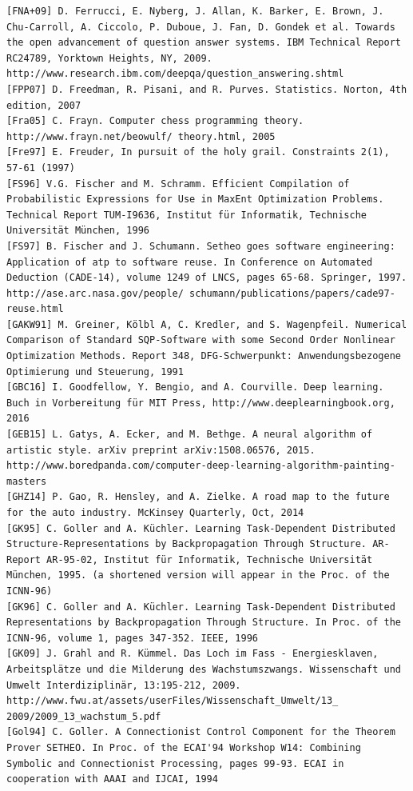 \documentclass[10pt]{book}
\begin{document}
\begin{center}
\begin{enumerate}
\begin{center}
\begin{center}
\begin{center}
\begin{center}
\begin{center}
\begin{verbatim}
[FNA+09] D. Ferrucci, E. Nyberg, J. Allan, K. Barker, E. Brown, J. Chu-Carroll, A. Ciccolo, P. Duboue, J. Fan, D. Gondek et al. Towards the open advancement of question answer systems. IBM Technical Report RC24789, Yorktown Heights, NY, 2009. http://www.research.ibm.com/deepqa/question_answering.shtml
[FPP07] D. Freedman, R. Pisani, and R. Purves. Statistics. Norton, 4th edition, 2007
[Fra05] C. Frayn. Computer chess programming theory. http://www.frayn.net/beowulf/ theory.html, 2005
[Fre97] E. Freuder, In pursuit of the holy grail. Constraints 2(1), 57-61 (1997)
[FS96] V.G. Fischer and M. Schramm. Efficient Compilation of Probabilistic Expressions for Use in MaxEnt Optimization Problems. Technical Report TUM-I9636, Institut für Informatik, Technische Universität München, 1996
[FS97] B. Fischer and J. Schumann. Setheo goes software engineering: Application of atp to software reuse. In Conference on Automated Deduction (CADE-14), volume 1249 of LNCS, pages 65-68. Springer, 1997. http://ase.arc.nasa.gov/people/ schumann/publications/papers/cade97-reuse.html
[GAKW91] M. Greiner, Kölbl A, C. Kredler, and S. Wagenpfeil. Numerical Comparison of Standard SQP-Software with some Second Order Nonlinear Optimization Methods. Report 348, DFG-Schwerpunkt: Anwendungsbezogene Optimierung und Steuerung, 1991
[GBC16] I. Goodfellow, Y. Bengio, and A. Courville. Deep learning. Buch in Vorbereitung für MIT Press, http://www.deeplearningbook.org, 2016
[GEB15] L. Gatys, A. Ecker, and M. Bethge. A neural algorithm of artistic style. arXiv preprint arXiv:1508.06576, 2015. http://www.boredpanda.com/computer-deep-learning-algorithm-painting-masters
[GHZ14] P. Gao, R. Hensley, and A. Zielke. A road map to the future for the auto industry. McKinsey Quarterly, Oct, 2014
[GK95] C. Goller and A. Küchler. Learning Task-Dependent Distributed Structure-Representations by Backpropagation Through Structure. AR-Report AR-95-02, Institut für Informatik, Technische Universität München, 1995. (a shortened version will appear in the Proc. of the ICNN-96)
[GK96] C. Goller and A. Küchler. Learning Task-Dependent Distributed Representations by Backpropagation Through Structure. In Proc. of the ICNN-96, volume 1, pages 347-352. IEEE, 1996
[GK09] J. Grahl and R. Kümmel. Das Loch im Fass - Energiesklaven, Arbeitsplätze und die Milderung des Wachstumszwangs. Wissenschaft und Umwelt Interdiziplinär, 13:195-212, 2009. http://www.fwu.at/assets/userFiles/Wissenschaft_Umwelt/13_ 2009/2009_13_wachstum_5.pdf
[Gol94] C. Goller. A Connectionist Control Component for the Theorem Prover SETHEO. In Proc. of the ECAI'94 Workshop W14: Combining Symbolic and Connectionist Processing, pages 99-93. ECAI in cooperation with AAAI and IJCAI, 1994

\end{verbatim}
\end{center}
\end{center}
\end{center}
\end{center}
\end{center}
\end{enumerate}
\end{center}
\end{document}
